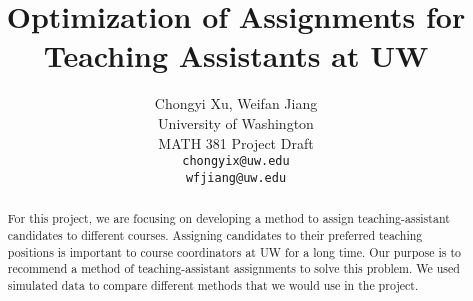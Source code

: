 \documentclass[twoside,twocolumn]{article}
\title{\LARGE \bf
    Optimization of Assignments for Teaching Assistants at UW
    }
\author{ \parbox{3 in}{\centering Chongyi Xu, Weifan Jiang \\
             University of Washington\\
             MATH 381 Project Draft\\
             {\tt\small chongyix@uw.edu}\\{\tt\small wfjiang@uw.edu}}
    }
\begin{document}
    \maketitle

    \begin{abstract}

    \indent For this project, we are focusing on developing a method to assign teaching-assistant candidates
    to different courses. Assigning candidates to their preferred teaching positions is important to 
    course coordinators at UW for a long time. Our purpose is to recommend a method of teaching-assistant
    assignments to solve this problem. We used simulated data to compare different methods that 
    we would use in the project.
        
    \end{abstract}

    \linespread{1.05} %
\end{document}
